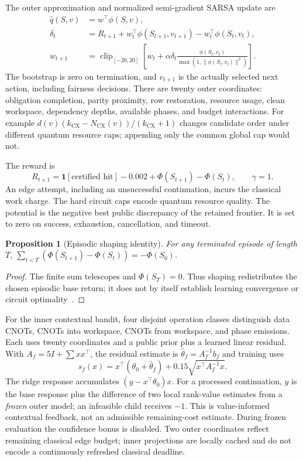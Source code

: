 \documentclass[11pt]{article}
\newtheorem{proposition}[theorem]{Proposition}
\theoremstyle{definition}\newtheorem{definition}[theorem]{Definition}
\newcommand{\CN}{N_{\mathrm{CX}}}
\begin{document}
The outer approximation and normalized semi-gradient SARSA update are
\begin{align}
\hat q(S,v)&=w^\top\phi(S,v),\\
\delta_t&=R_{t+1}+w_t^\top\phi(S_{t+1},v_{t+1})-w_t^\top\phi(S_t,v_t),\\
w_{t+1}&=\operatorname{clip}_{[-20,20]}\left[w_t+
\alpha\delta_t\frac{\phi(S_t,v_t)}{\max(1,\|\phi(S_t,v_t)\|^2)}\right].
\end{align}
The bootstrap is zero on termination, and $v_{t+1}$ is the actually selected next action, including fairness decisions. There are twenty outer coordinates: obligation completion, parity proximity, row restoration, resource usage, clean workspace, dependency depths, available phases, and budget interactions. For example $d(v)(k_{\mathrm{CX}}-\CN(v))/(k_{\mathrm{CX}}+1)$ changes candidate order under different quantum resource caps; appending only the common global cap would not.

The reward is
\begin{equation}
R_{t+1}=\mathbf1[\text{certified hit}]-0.002+\Phi(S_{t+1})-\Phi(S_t),\qquad \gamma=1.
\end{equation}
An edge attempt, including an unsuccessful continuation, incurs the classical work charge. The hard circuit caps encode quantum resource quality. The potential is the negative best public discrepancy of the retained frontier. It is set to zero on success, exhaustion, cancellation, and timeout.
\begin{proposition}[Episodic shaping identity]
For any terminated episode of length $T$, $\sum_{t<T}(\Phi(S_{t+1})-\Phi(S_t))=-\Phi(S_0)$.
\end{proposition}
\begin{proof}
The finite sum telescopes and $\Phi(S_T)=0$. Thus shaping redistributes the chosen episodic base return; it does not by itself establish learning convergence or circuit optimality~\cite{ng1999,sutton2018}.
\end{proof}

For the inner contextual bandit, four disjoint operation classes distinguish data CNOTs, CNOTs into workspace, CNOTs from workspace, and phase emissions. Each uses twenty coordinates and a public prior plus a learned linear residual. With $A_f=5I+\sum xx^\top$, the residual estimate is $\hat\theta_f=A_f^{-1}b_f$ and training uses
\begin{equation}
s_f(x)=x^\top(\theta_0+\hat\theta_f)+0.15\sqrt{x^\top A_f^{-1}x}.
\end{equation}
The ridge response accumulates $(y-x^\top\theta_0)x$. For a processed continuation, $y$ is the base response plus the difference of two local rank-value estimates from a \emph{frozen} outer model; an infeasible child receives $-1$. This is value-informed contextual feedback, not an admissible remaining-cost estimate. During frozen evaluation the confidence bonus is disabled. Two outer coordinates reflect remaining classical edge budget; inner projections are locally cached and do not encode a continuously refreshed classical deadline.
\end{document}
